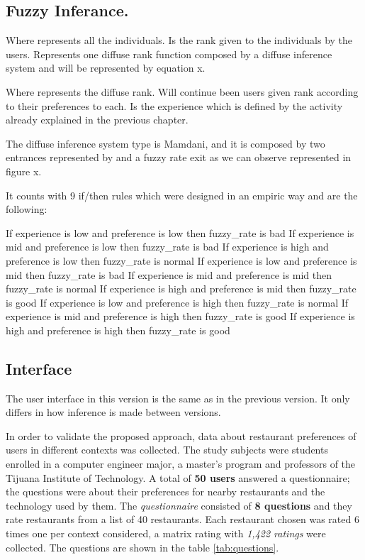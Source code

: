 \subsection{Fuzzy Inferance.}
Where represents all the individuals.
Is the rank given to the individuals by the users.
Represents one diffuse rank function composed by a diffuse inference system and will be represented by equation x.


Where represents the diffuse rank.
Will continue been users given rank according to their preferences to each.
Is the experience which is defined by the activity already explained in the previous chapter.

The diffuse inference system type is Mamdani, and it is composed by two entrances represented by and a fuzzy rate exit as we can observe represented in figure x.


It counts with 9 if/then rules which were designed in an empiric way and are the following:

If experience is low and preference is low then fuzzy\_rate is bad
If experience is mid and preference is low then fuzzy\_rate is bad
If experience is high and preference is low then fuzzy\_rate is normal
If experience is low and preference is mid then fuzzy\_rate is bad
If experience is mid and preference is mid then fuzzy\_rate is normal
If experience is high and preference is mid then fuzzy\_rate is good
If experience is low and preference is high then fuzzy\_rate is normal
If experience is mid and preference is high then fuzzy\_rate is good
If experience is high and preference is high then fuzzy\_rate is good

\subsection{Interface}

The user interface in this version is the same as in the previous version. It only differs in how inference is made between versions.




In order to validate the proposed approach, data about restaurant
preferences of users in different contexts was collected. The study
subjects were students enrolled in a computer engineer major, a
master’s program and professors of the Tijuana Institute of
Technology. A total of \textbf{50 users} answered a questionnaire; the
questions were about their preferences for nearby restaurants and the
technology used by them. The \textit{questionnaire} consisted of \textbf{8
	questions} and they rate restaurants from a list of 40 restaurants.
Each restaurant chosen was rated 6 times one per context considered, a
matrix rating with \textit{1,422 ratings} were collected. The
questions are shown in the table \ref{tab:questions}.



